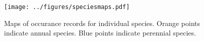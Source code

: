 \documentclass[man,floatsintext]{apa6}
\theoremstyle{definition}
\theoremstyle{definition}
\theoremstyle{definition}
\theoremstyle{remark}
\begin{document}
\begin{figure}
\centering
\texttt{[image: ../figures/speciesmaps.pdf]}
\caption{\label{fig:speciesmaps}Maps of occurance records for individual species.
Orange points indicate annual species. Blue points indicate perennial
species.}
\end{figure}
\end{document}
